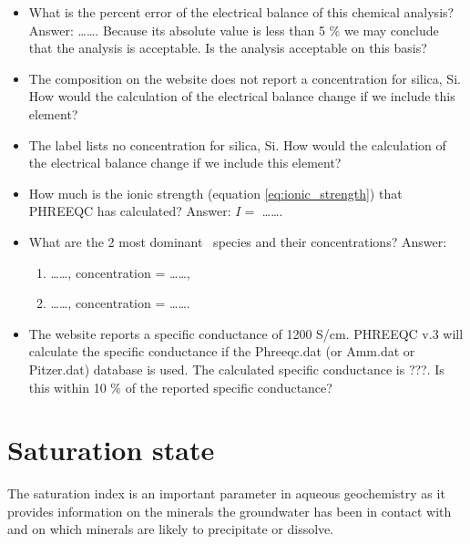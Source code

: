 \begin{itemize}

\item What is the percent error of the electrical balance of this chemical analysis? Answer: \ldots\ldots. Because its absolute value is less than 5 \% we may conclude that the analysis is acceptable.
Is the analysis acceptable on this basis?

\item The composition on the website does not report a concentration for silica, Si. How would the calculation of the electrical balance change if we include this element?

\item The label lists no concentration for silica, Si. How would the calculation of the electrical balance change if we include this element?

\item How much is the ionic strength (equation \ref{eq:ionic_strength}) that PHREEQC has calculated? Answer: $I =$ \ldots\ldots.

\item What are the 2 most dominant \ca\ species and their concentrations? Answer: 

\begin{enumerate}
\item \ldots\ldots, concentration = \ldots\ldots, 

\item \ldots\ldots, concentration = \ldots\ldots.
\end{enumerate}


\item The website reports a specific conductance of 1200 \micro S/cm.  
PHREEQC v.3 will calculate the specific conductance 
if the Phreeqc.dat (or Amm.dat or Pitzer.dat) database is used.  
The calculated specific conductance is ???.
Is this within 10 \% of the reported specific conductance?

\end{itemize}


\newpage

\section{Saturation state}

The saturation index is an important parameter in aqueous geochemistry as it provides information on the minerals the groundwater has been in contact with and on which minerals are likely to precipitate or dissolve.

